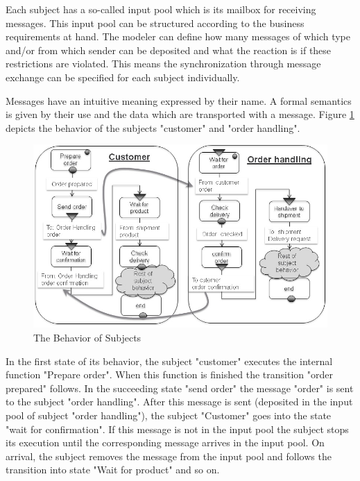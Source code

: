 Each subject has a so-called input pool which is its mailbox for receiving messages. This input pool can be structured according to the business requirements at hand. The modeler can define how many messages of which type and/or from which sender can be deposited and what the reaction is if these restrictions are violated. This means the synchronization through message exchange can be specified for each subject individually.

Messages have an intuitive meaning expressed by their name. A formal semantics is given by their use and the data which are transported with a message. Figure \ref{fig:ordercustomerorderhandling} depicts the behavior of the subjects "customer" and "order handling".

\begin{figure}[htbp]
	\centering
	\includegraphics[width=0.9\linewidth]{Figures/Ontology/SubjectExecution/OrderCustomerOrderHandling}
	\caption[The Behavior of Subjects]{The Behavior of Subjects}
	\label{fig:ordercustomerorderhandling}
\end{figure}

In the first state of its behavior, the subject "customer" executes the internal function "Prepare order". When this function is finished the transition "order prepared" follows. In the succeeding state "send order" the message "order" is sent to the subject "order handling". After this message is sent (deposited in the input pool of subject "order handling"), the subject "Customer" goes into the state "wait for confirmation". If this message is not in the input pool the subject stops its execution until the corresponding message arrives in the input pool. On arrival, the subject removes the message from the input pool and follows the transition into state "Wait for product" and so on.

